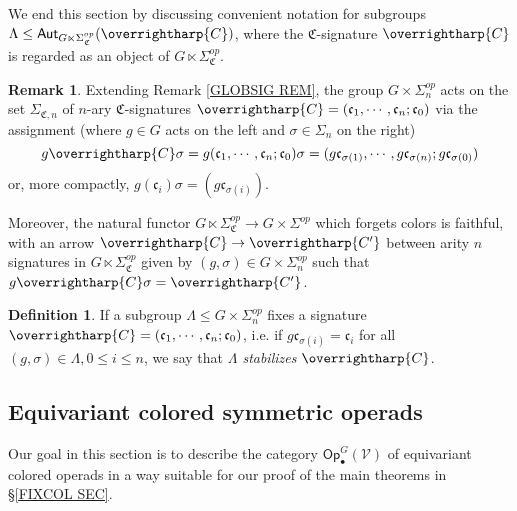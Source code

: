 \documentclass[a4paper,10pt
,draft
]{article}%
\numberwithin{equation}{section}
\numberwithin{figure}{section}
\theoremstyle{definition} %
\newtheorem{definition}[equation]{Definition}%
\newtheorem{remark}[equation]{Remark}%
\newcommand{\vect}[1]{\text{\overrightharp{\ensuremath{#1}}}}
\newcommand{\V}{\ensuremath{\mathcal V}}
\newcommand{\1}{\ensuremath{\mathbbm 1}}%
\begin{document}
We end this section by discussing convenient notation  
for subgroups 
$\Lambda \leq \mathsf{Aut}_{G \ltimes \Sigma_{\mathfrak{C}}^{op}}(\vect{C})$,
where the $\mathfrak{C}$-signature $\vect{C}$
is regarded as an object of 
$G \ltimes \Sigma_{\mathfrak{C}}^{op}$.



\begin{remark}\label{SIGACT REM}
	Extending Remark \ref{GLOBSIG REM}, 
	the group $G \times \Sigma_n^{op}$
	acts on the set $\Sigma_{\mathfrak{C},n}$
	of $n$-ary $\mathfrak{C}$-signatures
	$\vect{C} = (\mathfrak{c}_1,\cdots,\mathfrak{c}_n;\mathfrak{c}_0)$
	via the assignment (where $g \in G$ acts on the left and $\sigma \in \Sigma_n$ on the right)
	\begin{equation}\label{SIGACT_EQ}
	g \vect{C} \sigma =
	g (\mathfrak{c}_1,\cdots,\mathfrak{c}_n;\mathfrak{c}_0) \sigma
	=
	(g\mathfrak{c}_{\sigma(1)},\cdots,g\mathfrak{c}_{\sigma(n)};g\mathfrak{c}_{\sigma(0)})
	\end{equation}
	or, more compactly, $g (\mathfrak{c}_i) \sigma = (g \mathfrak{c}_{\sigma(i)})$.
	
	Moreover, the natural functor 
	$G \ltimes \Sigma^{op}_{\mathfrak{C}}
	\to G \times \Sigma^{op}$
	which forgets colors is faithful,
	with an arrow
	$\vect{C} \to \vect{C'}$
	between arity $n$ signatures
	in $G \ltimes \Sigma_{\mathfrak{C}}^{op}$
	given by 
	$(g,\sigma) \in G \times \Sigma_n^{op}$
	such that
	$g \vect{C} \sigma = \vect{C'}$.
\end{remark}




\begin{definition}\label{STABS DEF}
	If a subgroup $\Lambda \leq G \times \Sigma_n^{op}$
	fixes a signature 
	$\vect{C} = (\mathfrak{c}_1,\cdots,\mathfrak{c}_n;\mathfrak{c}_0)$,
	i.e. if
	$g\mathfrak{c}_{\sigma(i)} = \mathfrak{c}_i$
	for all $(g, \sigma) \in \Lambda, 0 \leq i \leq n$,
	we say that \textit{$\Lambda$ stabilizes $\vect C$}. 
\end{definition}






\subsection{Equivariant colored symmetric operads}
\label{EQCOSYMOP SEC}




Our goal in this section is to describe the category 
$\mathsf{Op}^{G}_{\bullet}(\V)$
of equivariant colored operads in a way suitable for our 
proof of the main theorems in \S \ref{FIXCOL SEC}. %
\end{document}
